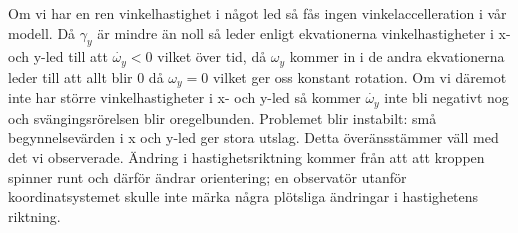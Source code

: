 \documentclass[12pt,a4paper]{article}
\begin{document}
Om vi har en ren vinkelhastighet i något led så fås ingen vinkelaccelleration i vår modell. Då $\gamma_y$ är mindre än noll så leder enligt ekvationerna vinkelhastigheter i x- och y-led till att $\dot{\omega_y}<0$ vilket över tid, då $\omega_y$ kommer in i de andra ekvationerna leder till att allt blir 0 då $\omega_y=0$ vilket ger oss konstant rotation. Om vi däremot inte har större vinkelhastigheter i x- och y-led så kommer $\dot{\omega_y}$ inte bli negativt nog och svängingsrörelsen blir oregelbunden. Problemet blir instabilt: små begynnelsevärden i x och y-led ger stora utslag. Detta överänsstämmer väll med det vi observerade.
Ändring i hastighetsriktning kommer från att att kroppen spinner runt och därför ändrar orientering; en observatör utanför koordinatsystemet skulle inte märka några plötsliga ändringar i hastighetens riktning.
\end{document}
